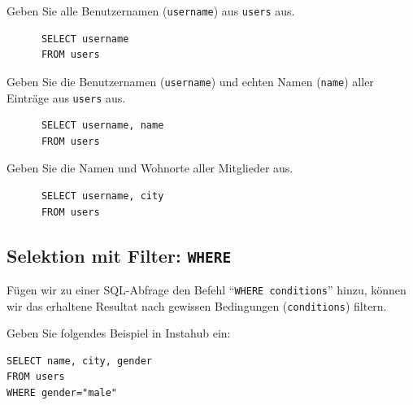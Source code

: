 \begin{myexercise}
  Geben Sie alle Benutzernamen (\texttt{username}) aus \texttt{users} aus.
  \begin{myanswer}
    \begin{lstlisting}
      SELECT username
      FROM users
      \end{lstlisting}
  \end{myanswer}
\end{myexercise}

\begin{myexercise}
  Geben Sie die Benutzernamen (\texttt{username}) und echten Namen (\texttt{name}) aller Einträge aus \texttt{users} aus.
  \begin{myanswer}
    \begin{lstlisting}
      SELECT username, name
      FROM users
    \end{lstlisting}
  \end{myanswer}
\end{myexercise}

\begin{myexercise}
  Geben Sie die Namen und Wohnorte aller Mitglieder aus.
  \begin{myanswer}
    \begin{lstlisting}
      SELECT username, city
      FROM users
    \end{lstlisting}
  \end{myanswer}
\end{myexercise}

\subsection{Selektion mit Filter: \texorpdfstring{\lstinline|WHERE|}{WHERE}}
Fügen wir zu einer \gls{SQL}-Abfrage den Befehl \enquote{\lstinline|WHERE conditions|} hinzu, können wir das erhaltene Resultat nach gewissen Bedingungen (\texttt{conditions}) filtern.

\begin{myexample}
Geben Sie folgendes Beispiel in Instahub ein:

\begin{lstlisting}
SELECT name, city, gender
FROM users
WHERE gender="male"
\end{lstlisting}
\end{myexample}

